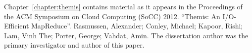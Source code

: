 Chapter~\ref{chapter:themis} contains material as it appears in the Proceedings
of the ACM Symposium on Cloud Computing (SoCC) 2012. ``Themis: An I/O-Efficient
MapReduce''. Rasmussen, Alexander; Conley, Michael; Kapoor, Rishi; Lam, Vinh
The; Porter, George; Vahdat, Amin. The dissertation author was the primary
investigator and author of this paper.
